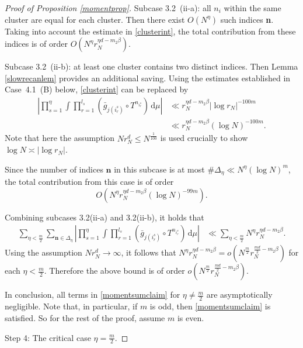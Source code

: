 \documentclass[10pt,a4paper]{amsart}
\renewcommand{\d}{\, \text{d}}
\begin{document}
\begin{proof}[Proof of Proposition \ref{momentprop}]
Subcase 3.2~(ii-a): all $n_i$ within the same cluster are equal for each cluster.
Then there exist $O(N^\eta)$ such indices \textbf{n}. Taking into account the estimate in \eqref{clusterint}, the total contribution from these indices is of order $O\left(N^{\eta} r_N^{\eta d - m_2 \beta}\right).$



Subcase 3.2~(ii-b): at least one cluster contains two distinct indices. Then Lemma \ref{slowrecanlem} provides an additional saving. Using the estimates established in Case~4.1~(B) below,
\eqref{clusterint} can be replaced by
\begin{align*}
\left| \prod_{s=1}^{\eta} \int \prod_{r=1}^{l_s} (\bar{g}_{j(i^s_r)} \circ T^{n_{i^s_r}} )\d\mu \right| &\ll
r_N^{\eta d - m_2 \beta} |\log r_N|^{-100m} \\
&\ll
r_N^{\eta d - m_2 \beta} (\log N)^{-100m}.
\end{align*}
Note that here the assumption $N r_N^d\leq N^{\frac{1}{100}}$ is used crucially to show $\log N \asymp |\log r_N|$.

Since the number of indices $\mathbf{n}$ in this subcase is at most $\#\Delta_{\eta}\ll N^{\eta} (\log N)^m$, the total contribution from this case is of order
\begin{equation*}
O\left(N^{\eta} r_N^{\eta d - m_2 \beta} (\log N)^{-99m}\right).
\end{equation*}


Combining subcases 3.2(ii-a) and 3.2(ii-b), it holds that
\begin{align*}
\sum_{\eta < \frac{m}{2}} \sum_{\textbf{n} \in \Delta_{\eta}} \left| \prod_{s=1}^{\eta} \int \prod_{r=1}^{l_s} (\bar{g}_{j(i^s_r)} \circ T^{n_{i^s_r}}) \d\mu\right| &\ll \sum_{\eta < \frac{m}{2}} N^{\eta} r_N^{\eta d - m_2 \beta}.
\end{align*}
Using the assumption $N r_N^d \rightarrow\infty$, it follows that $N^{\eta} r_N^{\eta d - m_2 \beta} =o\left( N^{\frac{m}{2}} r_N^{\frac{md}{2} - m_2 \beta}\right)$ for each $\eta<\frac{m}{2}$. Therefore the above bound is of order $o\left( N^{\frac{m}{2}} r_N^{\frac{md}{2} - m_2 \beta}\right)$.


In conclusion, all terms in \eqref{momentsumclaim} for $\eta \neq \frac{m}{2}$ are asymptotically negligible. Note that, in particular, if $m$ is odd, then \eqref{momentsumclaim} is satisfied. So for the rest of the proof, assume $m$ is even.

Step 4: The critical case $\eta=\frac{m}{2}$.


\end{proof}
\end{document}
